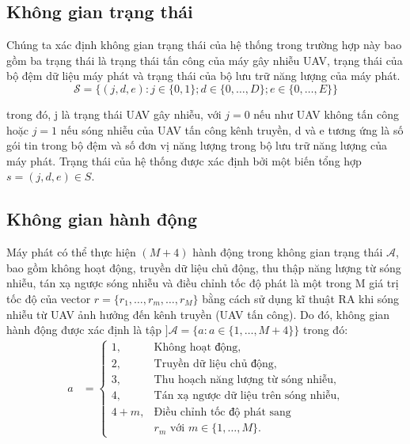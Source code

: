 \documentclass{uetgraduation}
\begin{document}
\subsection{Không gian trạng thái}
Chúng ta xác định không gian trạng thái của hệ thống trong trường hợp này bao gồm ba trạng thái là trạng thái tấn công của máy gây nhiễu UAV, trạng thái của bộ đệm dữ liệu máy phát và trạng thái của bộ lưu
trữ năng lượng của máy phát.
\begin{equation}
    \mathcal{S} = \{(j, d, e) : j \in \{0, 1\}; d \in \{0, \dots, D\}; e \in \{0, \dots, E\}\}
\end{equation}

trong đó, j là trạng thái UAV gây nhiễu, với $j = 0$ nếu như UAV không tấn công hoặc $j = 1$ nếu sóng nhiễu của UAV tấn công kênh truyền, d và e tương ứng là số gói tin trong bộ
đệm và số đơn vị năng lượng trong bộ lưu trữ năng lượng của máy phát. Trạng thái của hệ thống được xác định bởi một biến tổng hợp $s = (j, d, e) \in S$.

\subsection{Không gian hành động}
Máy phát có thể thực hiện $(M+4)$ hành động trong không gian trạng thái $\mathcal{A}$, bao gồm không hoạt động, truyền dữ liệu chủ động, thu thập năng lượng từ sóng nhiễu, tán xạ ngược sóng
nhiễu và điều chỉnh tốc độ phát là một trong M giá trị tốc độ của vector $r = \{r_1, \dots, r_m,\dots, r_M\}$ bằng cách sử dụng kĩ thuật RA khi sóng nhiễu từ UAV ảnh hưởng đến
kênh truyền (UAV tấn công). Do đó, không gian hành động được xác định là tập $]\mathcal{A} = \{a : a \in \{1, \dots, M+4\}\}$ trong đó:
\begin{equation}
    \begin{split}
        a &= \begin{cases}
            1, & \text{Không hoạt động,} \\
            2, & \text{Truyền dữ liệu chủ động,} \\
            3, & \text{Thu hoạch năng lượng từ sóng nhiễu,} \\
            4, & \text{Tán xạ ngược dữ liệu trên sóng nhiễu,} \\
            4 + m, & \text{Điều chỉnh tốc độ phát sang } \\
                    & r_m \text{ với } m \in \{1, \ldots, M\}.
        \end{cases}
    \end{split}
\end{equation}
\end{document}
